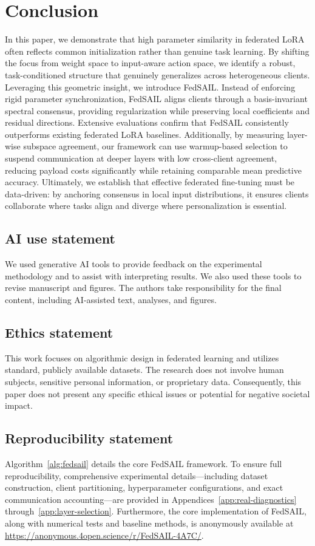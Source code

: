 \documentclass[11pt,letterpaper]{article}
\begin{document}
\section{Conclusion}
In this paper, we demonstrate that high parameter similarity in federated LoRA often reflects common initialization rather than genuine task learning. By shifting the focus from weight space to input-aware action space, we identify a robust, task-conditioned structure that genuinely generalizes across heterogeneous clients. Leveraging this geometric insight, we introduce FedSAIL. Instead of enforcing rigid parameter synchronization, FedSAIL aligns clients through a basis-invariant spectral consensus, providing regularization while preserving local coefficients and residual directions. Extensive evaluations confirm that FedSAIL consistently outperforms existing federated LoRA baselines. Additionally, by measuring layer-wise subspace agreement, our framework can use warmup-based selection to suspend communication at deeper layers with low cross-client agreement, reducing payload costs significantly while retaining comparable mean predictive accuracy. Ultimately,  we establish that effective federated fine-tuning must be data-driven: by anchoring consensus in local input distributions, it ensures clients collaborate where tasks align and diverge where personalization is essential.





\subsection*{AI use statement}
We used generative AI tools to provide feedback on the experimental methodology
and to assist with interpreting results. We also used these tools to revise manuscript and figures. The authors take
responsibility for the final content, including AI-assisted text, analyses,
and figures.

\subsection*{Ethics statement}
This work focuses on algorithmic design in federated learning and utilizes standard, publicly available datasets. The research does not involve human subjects, sensitive personal information, or proprietary data. Consequently, this paper does not present any specific ethical issues or potential for negative societal impact.

\subsection*{Reproducibility statement}
Algorithm~\ref{alg:fedsail} details the core FedSAIL framework. To ensure full reproducibility, comprehensive experimental details—including dataset construction, client partitioning, hyperparameter configurations, and exact communication accounting—are provided in Appendices~\ref{app:real-diagnostics} through~\ref{app:layer-selection}. Furthermore, the core implementation of FedSAIL, along with numerical tests and baseline methods, is anonymously available at \url{https://anonymous.4open.science/r/FedSAIL-4A7C/}.
\end{document}
